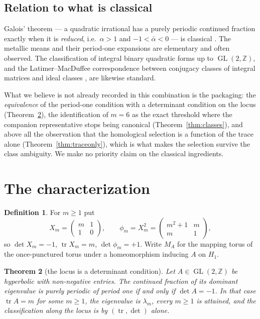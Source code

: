 \documentclass[11pt,a4paper]{article}
\newtheorem{theorem}{Theorem}[section]
\theoremstyle{definition}
\newtheorem{definition}[theorem]{Definition}
\theoremstyle{remark}
\newcommand{\GL}{\operatorname{GL}}
\newcommand{\Z}{\mathbb{Z}}
\newcommand{\tr}{\operatorname{tr}}
\begin{document}
\subsection{Relation to what is classical}

Galois' theorem --- a quadratic irrational has a purely periodic continued fraction exactly
when it is \emph{reduced}, i.e.\ $\alpha>1$ and $-1<\bar\alpha<0$ --- is classical
\cite{Perron,HardyWright}. The metallic means and their period-one expansions are elementary
and often observed. The classification of integral binary quadratic forms up to $\GL(2,\Z)$,
and the Latimer--MacDuffee correspondence between conjugacy classes of integral matrices and
ideal classes \cite{LatimerMacDuffee,Taussky}, are likewise standard.

What we believe is not already recorded in this combination is the packaging: the
\emph{equivalence} of the period-one condition with a determinant condition on the locus
(Theorem~\ref{thm:canonical}), the identification of $m=6$ as the exact threshold where the
companion representative stops being canonical (Theorem~\ref{thm:classes}), and above all the
observation that the homological selection is a function of the trace alone
(Theorem~\ref{thm:traceonly}), which is what makes the selection survive the class ambiguity.
We make no priority claim on the classical ingredients.

\section{The characterization}\label{sec:char}

\begin{definition}\label{def:family}
For $m\ge1$ put
\[
   X_m=\begin{pmatrix}m&1\\1&0\end{pmatrix},\qquad
   \phi_m=X_m^{2}=\begin{pmatrix}m^2+1&m\\m&1\end{pmatrix},
\]
so $\det X_m=-1$, $\tr X_m=m$, $\det\phi_m=+1$. Write $M_A$ for the mapping torus of the
once-punctured torus under a homeomorphism inducing $A$ on $H_1$.
\end{definition}

\begin{theorem}[the locus is a determinant condition]\label{thm:canonical}
Let $A\in\GL(2,\Z)$ be hyperbolic with non-negative entries. The continued fraction of its
dominant eigenvalue is purely periodic of period one if and only if $\det A=-1$. In that
case $\tr A=m$ for some $m\ge1$, the eigenvalue is $\lambda_m$, every $m\ge1$ is attained,
and the classification along the locus is by $(\tr,\det)$ alone.
\end{theorem}
\end{document}
